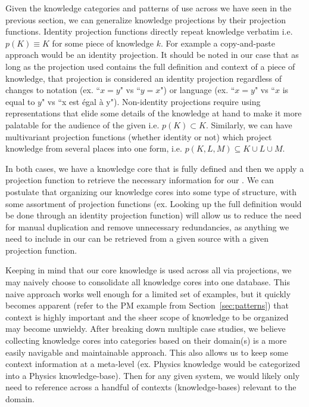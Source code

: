 Given the knowledge categories and patterns of use across \sfs{} we have seen 
in the previous section, we can generalize knowledge projections by their 
projection functions.  Identity 
projection functions directly repeat knowledge 
verbatim i.e. $p(K) \equiv K$ for some piece of knowledge $k$. For example a 
copy-and-paste approach would be an identity projection.  It should be noted in 
our case that as long as the projection used contains the full definition and 
context of a piece of knowledge, that projection is considered an identity 
projection regardless of changes to notation (ex. ``$x = y$" vs ``$y = x$") or 
language (ex. ``$x = y$" vs ``$x$ is equal to $y$" vs ``x est \'egal \`a y"). 
Non-identity projections require using representations that elide some details 
of the knowledge at hand to make it more palatable for the audience of the 
given \sf{} i.e. $p(K) \subset K$. Similarly, we can have multivariant 
projection functions (whether identity or not) which project knowledge from 
several places into one form, i.e. $p(K,L,M) \subseteq K\cup L\cup M$.

In both cases, we have a knowledge core that is fully defined and then we apply 
a projection function to retrieve the necessary information for our \sf{}. We 
can postulate that organizing our knowledge cores into some type of structure, 
with some assortment of projection functions (ex. Looking up the full 
definition would be done through an identity projection function) will allow 
us to reduce the need for manual duplication and remove unnecessary 
redundancies, as anything we need to include in our \sfs{} can be retrieved 
from a given source with a given projection function.

Keeping in mind that our core knowledge is used across all \sfs{} via 
projections, we may naively choose to consolidate all knowledge cores into one 
database. This naive approach works well enough for a limited set of examples, 
but it quickly becomes apparent (refer to the PM example from 
Section~\ref{sec:patterns}) that context is highly important and the sheer 
scope of knowledge to be organized may become unwieldy. After breaking down 
multiple case studies, we believe collecting knowledge cores into categories 
based on their domain(s) is a more easily navigable and maintainable approach. 
This also allows us to keep some context information at a meta-level (ex. 
Physics knowledge would be categorized into a Physics knowledge-base). Then for 
any given system, we would likely only need to reference across a handful of 
contexts (knowledge-bases) relevant to the domain.

